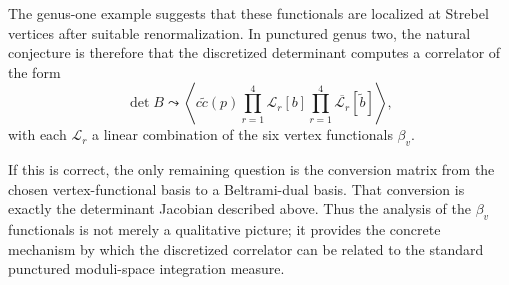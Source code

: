 \documentclass[12pt]{article}
\newcommand{\cL}{\mathcal{L}}
\newcommand{\wt}[1]{\widetilde{#1}}
\newcommand{\ol}[1]{\overline{#1}}
\begin{document}
The genus-one example suggests that these functionals are localized at Strebel vertices after suitable renormalization. In punctured genus two, the natural conjecture is therefore that the discretized determinant computes a correlator of the form
\begin{equation}
\det B \leadsto \left\langle c\wt{c}(p)\prod_{r=1}^4 \cL_r[b]\prod_{r=1}^4 \ol{\cL_r}[\wt{b}]\right\rangle,
\end{equation}
with each $\cL_r$ a linear combination of the six vertex functionals $\beta_v$.

If this is correct, the only remaining question is the conversion matrix from the chosen vertex-functional basis to a Beltrami-dual basis. That conversion is exactly the determinant Jacobian described above. Thus the analysis of the $\beta_v$ functionals is not merely a qualitative picture; it provides the concrete mechanism by which the discretized correlator can be related to the standard punctured moduli-space integration measure.
\end{document}
